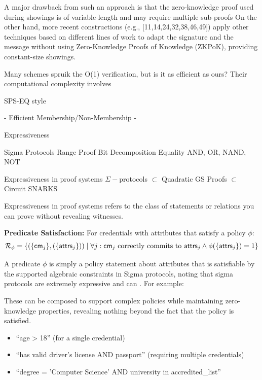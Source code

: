     A major drawback from such an approach is that the zero-knowledge proof used during showings is of variable-length and may require multiple sub-proofs On the other hand, more recent constructions (e.g., [11,14,24,32,38,46,49]) apply other techniques based on different lines of work to adapt the signature and the message without using Zero-Knowledge Proofs of Knowledge (ZKPoK), providing constant-size showings.

Many schemes spruik the O(1) verification, but is it as efficient as ours? 
Their computational complexity involves 



SPS-EQ style

- Efficient Membership/Non-Membership
- 

Expressiveness 

Sigma Protocols
Range Proof
Bit Decomposition
Equality
AND, OR, NAND, NOT


Expressiveness in proof systems
$\Sigma-$protocols $\subset$ Quadratic GS Proofs $\subset$ Circuit SNARKS

Expressiveness in proof systems refers to the class of statements or relations you can prove without revealing witnesses. 
































\textbf{Predicate Satisfaction:} For credentials with attributes that satisfy a policy $\phi$:
    \[
    \mathcal{R}_{\phi} = \{(\{\mathsf{cm}_j\}, (\{\mathsf{attrs}_j\})) \mid \forall j: \mathsf{cm}_j \text{ correctly commits to } \mathsf{attrs}_j \wedge
    \phi(\{\mathsf{attrs}_j\}) = 1 \}
    \]
    
    A predicate $\phi$ is simply a policy statement about attributes that is satisfiable by the supported algebraic constraints in Sigma protocols, noting that sigma protocols are extremely expressive and can  . For example:

    These can be composed to support complex policies while maintaining zero-knowledge properties, revealing nothing beyond the fact that the policy is satisfied.
    \begin{itemize}
    \item ``age > 18'' (for a single credential)
    \item ``has valid driver's license AND passport'' (requiring multiple credentials)
    \item ``degree = 'Computer Science' AND university in accredited\_list''
    \end{itemize}
    
